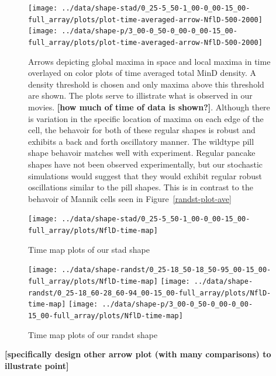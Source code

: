 \documentclass[letterpaper,twocolumn,amsmath,amssymb,pre]{revtex4-1}
\newcommand{\red}[1]{{\bf \color{red} #1}}
\newcommand{\fixme}[1]{\red{[#1]}}
\begin{document}
\begin{figure}
  \texttt{[image: ../data/shape-stad/0\_25-5\_50-1\_00-0\_00-15\_00-full\_array/plots/plot-time-averaged-arrow-NflD-500-2000]}
  \texttt{[image: ../data/shape-p/3\_00-0\_50-0\_00-0\_00-15\_00-full\_array/plots/plot-time-averaged-arrow-NflD-500-2000]}
  \caption{Arrows depicting global maxima in space and local maxima in
    time overlayed on color plots of time averaged total MinD
    density. A density threshold is chosen and only maxima above this
    threshold are shown. The plots serve to illistrate what is
    observed in our movies. \fixme{how much of time of data is
      shown?}.  Although there is variation in the specific location
    of maxima on each edge of the cell, the behavoir for both of these
    regular shapes is robust and exhibits a back and forth oscillatory
    manner.  The wildtype pill shape behavoir matches well with
    experiment.  Regular pancake shapes have not been observed
    experimentally, but our stochastic simulations would suggest that
    they would exhibit regular robust oscillations similar to the pill
    shapes.  This is in contrast to the behavoir of Mannik cells seen
    in Figure~\ref{randst-plot-ave}}
  \label{arrow-pill-stadium}
\end{figure}

\begin{figure}
  \texttt{[image: ../data/shape-stad/0\_25-5\_50-1\_00-0\_00-15\_00-full\_array/plots/NflD-time-map]}
  \caption{Time map plots of our stad shape}
  \label{time-maps-stad}
\end{figure}


\begin{figure}
  \texttt{[image: ../data/shape-randst/0\_25-18\_50-18\_50-95\_00-15\_00-full\_array/plots/NflD-time-map]}
  \texttt{[image: ../data/shape-randst/0\_25-18\_60-28\_60-94\_00-15\_00-full\_array/plots/NflD-time-map]}
  \texttt{[image: ../data/shape-p/3\_00-0\_50-0\_00-0\_00-15\_00-full\_array/plots/NflD-time-map]}
  \caption{Time map plots of our randst shape}
  \label{time-maps-randst}
\end{figure}


\fixme{specifically design other arrow plot (with many comparisons) to
  illustrate point}
\end{document}
